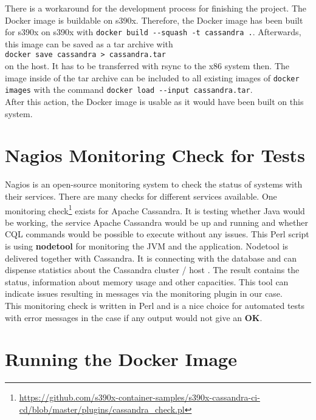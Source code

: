There is a workaround for the development process for finishing the project. The Docker image is buildable on s390x. Therefore, the Docker image has been built for s390x on s390x with  \lstinline!docker build --squash -t cassandra .!.
Afterwards, this image can be saved as a tar archive with \\
\lstinline!docker save cassandra > cassandra.tar!\\ 
on the host. It has to be transferred with rsync to the x86 system then. The image inside of the tar archive can be included to all existing images of \lstinline!docker images! with the command 
\lstinline!docker load --input cassandra.tar!. \\
After this action, the Docker image is usable as it would have been built on this system. 


\section{Nagios Monitoring Check for Tests}

Nagios is an open-source monitoring system to check the status of systems with their services. There are many checks for different services available. One monitoring check\footnote{\url{https://github.com/s390x-container-samples/s390x-cassandra-ci-cd/blob/master/plugins/cassandra_check.pl}} exists for Apache Cassandra. It is testing whether Java would be working, the service Apache Cassandra would be up and running and whether CQL commands would be possible to execute without any issues. This Perl script is using \textbf{nodetool} for monitoring the JVM and the application. Nodetool is delivered together with Cassandra. It is connecting with the database and can dispense statistics about the Cassandra cluster / host \cite[~p.256]{Carpenter2020}. The result contains the status, information about memory usage and other capacities. This tool can indicate issues resulting in messages via the monitoring plugin in our case.\\
This monitoring check is written in Perl and is a nice choice for automated tests with error messages in the case if any output would not give an \textbf{OK}. 

\section{Running the Docker Image}\label{RunningDockerImage}

